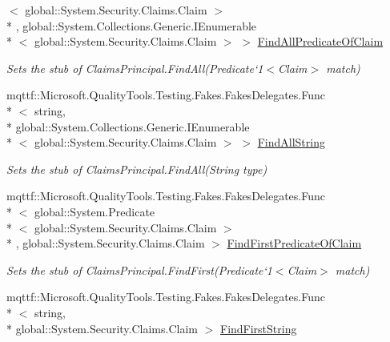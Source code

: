 \begin{DoxyCompactItemize}
$<$ global\-::\-System.\-Security.\-Claims.\-Claim $>$\\*
, global\-::\-System.\-Collections.\-Generic.\-I\-Enumerable\\*
$<$ global\-::\-System.\-Security.\-Claims.\-Claim $>$ $>$ \hyperlink{class_system_1_1_security_1_1_claims_1_1_fakes_1_1_stub_claims_principal_aac8a5f1d0a110a47290ba742899eb4c4}{Find\-All\-Predicate\-Of\-Claim}
\begin{DoxyCompactList}\small\item\em Sets the stub of Claims\-Principal.\-Find\-All(Predicate`1$<$Claim$>$ match)\end{DoxyCompactList}\item 
mqttf\-::\-Microsoft.\-Quality\-Tools.\-Testing.\-Fakes.\-Fakes\-Delegates.\-Func\\*
$<$ string, \\*
global\-::\-System.\-Collections.\-Generic.\-I\-Enumerable\\*
$<$ global\-::\-System.\-Security.\-Claims.\-Claim $>$ $>$ \hyperlink{class_system_1_1_security_1_1_claims_1_1_fakes_1_1_stub_claims_principal_ad4723118d4b0771e1157ee0c5c02a848}{Find\-All\-String}
\begin{DoxyCompactList}\small\item\em Sets the stub of Claims\-Principal.\-Find\-All(\-String type)\end{DoxyCompactList}\item 
mqttf\-::\-Microsoft.\-Quality\-Tools.\-Testing.\-Fakes.\-Fakes\-Delegates.\-Func\\*
$<$ global\-::\-System.\-Predicate\\*
$<$ global\-::\-System.\-Security.\-Claims.\-Claim $>$\\*
, global\-::\-System.\-Security.\-Claims.\-Claim $>$ \hyperlink{class_system_1_1_security_1_1_claims_1_1_fakes_1_1_stub_claims_principal_acc61ec0377e5470a3bbcac8bb61492a7}{Find\-First\-Predicate\-Of\-Claim}
\begin{DoxyCompactList}\small\item\em Sets the stub of Claims\-Principal.\-Find\-First(Predicate`1$<$Claim$>$ match)\end{DoxyCompactList}\item 
mqttf\-::\-Microsoft.\-Quality\-Tools.\-Testing.\-Fakes.\-Fakes\-Delegates.\-Func\\*
$<$ string, \\*
global\-::\-System.\-Security.\-Claims.\-Claim $>$ \hyperlink{class_system_1_1_security_1_1_claims_1_1_fakes_1_1_stub_claims_principal_a2007e48975afaa8654dfa264495a5cde}{Find\-First\-String}

\end{DoxyCompactItemize}
